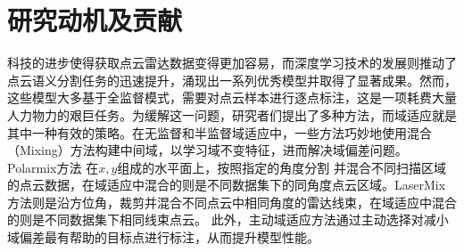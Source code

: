    \section{研究动机及贡献}
    科技的进步使得获取点云雷达数据变得更加容易，而深度学习技术的发展则推动了点云语义分割任务的迅速提升，涌现出一系列优秀模型并取得了显著成果。然而，这些模型大多基于全监督模式，需要对点云样本进行逐点标注，这是一项耗费大量人力物力的艰巨任务。为缓解这一问题，研究者们提出了多种方法，而域适应就是其中一种有效的策略。在无监督和半监督域适应中，一些方法巧妙地使用混合（Mixing）方法构建中间域，以学习域不变特征，进而解决域偏差问题。Polarmix方法
    在$x,y$组成的水平面上，按照指定的角度分割
    并混合不同扫描区域的点云数据，在域适应中混合的则是不同数据集下的同角度点云区域。LaserMix方法则是沿方位角，裁剪并混合不同点云中相同角度的雷达线束，在域适应中混合的则是不同数据集下相同线束点云。
    此外，主动域适应方法通过主动选择对减小域偏差最有帮助的目标点进行标注，从而提升模型性能。 

